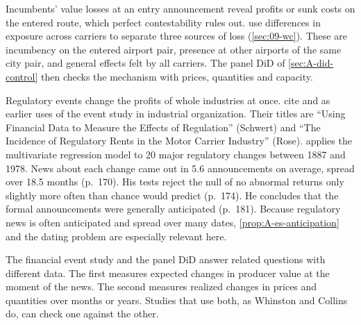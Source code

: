 Incumbents' value losses at an entry announcement reveal profits or sunk costs on the entered route, which perfect
contestability rules out. \citet{WhinstonCollins1992} use differences in exposure across carriers to separate three
sources of loss (\cref{sec:09-wc}). These are incumbency on the entered airport pair, presence at other airports of
the same city pair, and general effects felt by all carriers. The panel DiD of \cref{sec:A-did-control} then checks the mechanism with
prices, quantities and capacity.

Regulatory events change the profits of whole industries at once. \citet[p.~448, n.~5]{WhinstonCollins1992} cite
\citet{Schwert1981} and \citet{Rose1985} as earlier uses of the event study in industrial organization. Their titles
are ``Using Financial Data to Measure the Effects of Regulation'' (Schwert) and ``The Incidence of Regulatory Rents in
the Motor Carrier Industry'' (Rose).
\citet[pp.~168--169]{Binder1985} applies the multivariate regression model to 20 major regulatory changes between 1887 and 1978.
News about each change came out in 5.6 announcements on average, spread over 18.5 months (p.~170). His tests reject
the null of no abnormal returns only slightly more often than chance would predict (p.~174). He concludes that the
formal announcements were generally anticipated (p.~181).
Because regulatory news is often anticipated and spread over many dates,
\cref{prop:A-es-anticipation} and the dating problem are especially relevant here.

The financial event study and the panel DiD answer related questions with different data. The first measures
expected changes in producer value at the moment of the news. The second measures realized changes in prices and
quantities over months or years. Studies that use both, as Whinston and Collins do, can check one against the other.
